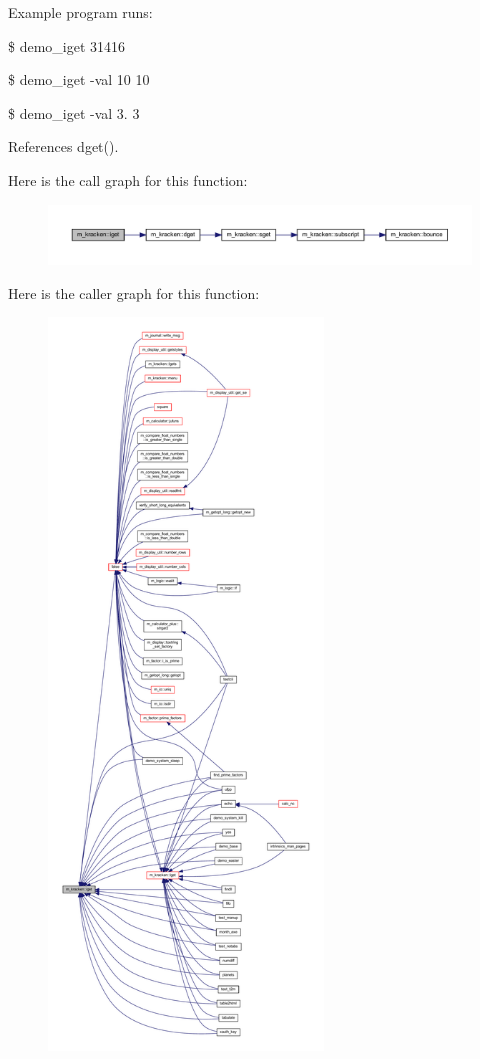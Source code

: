 Example program runs\+:

\$ demo\+\_\+iget 31416

\$ demo\+\_\+iget -\/val 10 10

\$ demo\+\_\+iget -\/val 3. 3 

References dget().

Here is the call graph for this function\+:
\nopagebreak
\begin{figure}[H]
\begin{center}
\leavevmode
\includegraphics[width=350pt]{namespacem__kracken_a420718890eac378e5cd047dd0b477424_cgraph}
\end{center}
\end{figure}
Here is the caller graph for this function\+:
\nopagebreak
\begin{figure}[H]
\begin{center}
\leavevmode
\includegraphics[height=550pt]{namespacem__kracken_a420718890eac378e5cd047dd0b477424_icgraph}
\end{center}
\end{figure}
\mbox{\label{namespacem__kracken_ac118bb44d855d68bfce6caa80d60e5e0}} 
